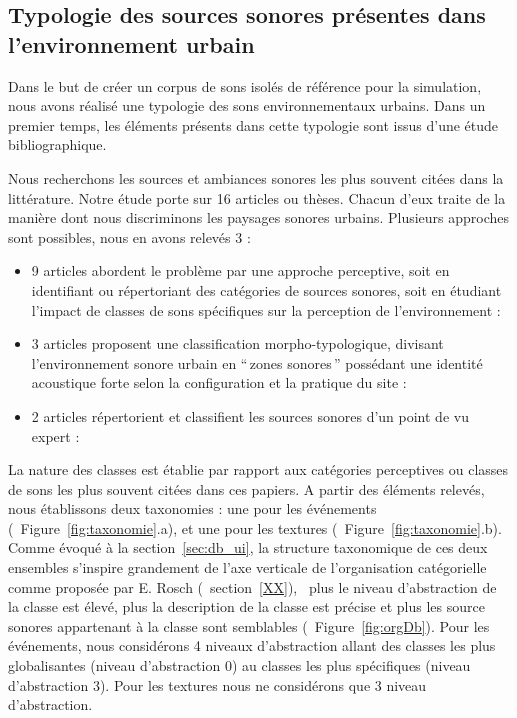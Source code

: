 \subsection{Typologie des sources sonores présentes dans l'environnement urbain}

Dans le but de créer un corpus de sons isolés de référence pour la simulation, nous avons réalisé une typologie des sons environnementaux urbains. Dans un premier temps, les éléments présents dans cette typologie sont issus d’une étude bibliographique.

Nous recherchons les sources et ambiances sonores les plus souvent citées dans la littérature. Notre étude porte sur 16 articles ou thèses. Chacun d’eux traite de la manière dont nous discriminons les paysages sonores urbains. Plusieurs approches sont possibles, nous en avons relevés 3 :

\begin{itemize}
\item 9 articles abordent le problème par une approche perceptive, soit en identifiant ou répertoriant des catégories de sources sonores, soit en étudiant l'impact de classes de sons spécifiques sur la perception de l'environnement : \cite{maffiolo_caracterisation_1999,raimbault2002simulation,guastavino_etude_2003,defreville2004aactivity,raimbault2005urban,dubois2006cognitive,devergie_relations_2006,guastavino2006ideal,niessen2010categories}
\item 3 articles proposent une classification morpho-typologique, divisant l’environnement sonore urbain en ``\,zones sonores\,'' possédant une identité acoustique forte selon la configuration et la pratique du site : \cite{maffiolo_caracterisation_1999,beaumont2004pertinence,polack2008perceptive}
\item 2 articles répertorient et classifient les sources sonores d’un point de vu expert : \cite{leobon_analyse_1986,brown2011towards}
\end{itemize}

La nature des classes est établie par rapport aux catégories perceptives ou classes de sons les plus souvent citées dans ces papiers. A  partir des éléments relevés, nous établissons deux taxonomies : une pour les événements (\cf~Figure~\ref{fig:taxonomie}.a), et une pour les textures (\cf~Figure~\ref{fig:taxonomie}.b). Comme évoqué à la section~\ref{sec:db_ui}, la structure taxonomique de ces deux ensembles s'inspire grandement de l'axe verticale de l'organisation catégorielle comme proposée par E. Rosch (\Cf~section~\ref{XX}), \ie~plus le niveau d'abstraction de la classe est élevé, plus la description de la classe est précise et plus les source sonores appartenant à la classe sont semblables (\Cf~Figure~\ref{fig:orgDb}). Pour les événements, nous considérons 4 niveaux d'abstraction allant des classes les plus globalisantes (niveau d'abstraction 0) au classes les plus spécifiques (niveau d'abstraction 3). Pour les textures nous ne considérons que 3 niveau d'abstraction.

